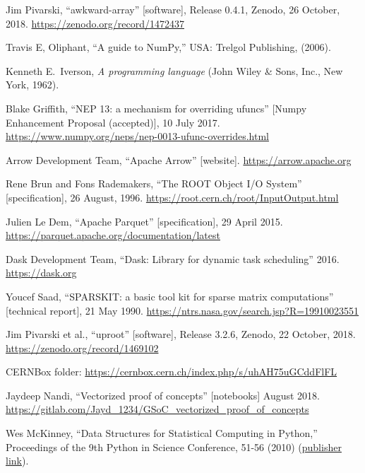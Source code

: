 \documentclass{webofc}
\begin{document}
\vspace{-0.15 cm}
\begin{thebibliography}{8}

 Jim Pivarski, ``awkward-array'' [software], Release 0.4.1, Zenodo, 26 October, 2018. \textcolor{blue}{\url{https://zenodo.org/record/1472437}}

 Travis E, Oliphant, ``A guide to NumPy,'' USA: Trelgol Publishing, (2006).

 Kenneth E.\ Iverson, \textit{A programming language} (John Wiley \& Sons, Inc., New York, 1962).

 Blake Griffith, ``NEP 13: a mechanism for overriding ufuncs'' [Numpy Enhancement Proposal (accepted)], 10 July 2017. \textcolor{blue}{\url{https://www.numpy.org/neps/nep-0013-ufunc-overrides.html}}

 Arrow Development Team, ``Apache Arrow'' [website]. \textcolor{blue}{\url{https://arrow.apache.org}}

 Rene Brun and Fons Rademakers, ``The ROOT Object I/O System'' [specification], 26 August, 1996. \textcolor{blue}{\url{https://root.cern.ch/root/InputOutput.html}}

 Julien Le Dem, ``Apache Parquet'' [specification], 29 April 2015. \textcolor{blue}{\url{https://parquet.apache.org/documentation/latest}}

 Dask Development Team, ``Dask: Library for dynamic task scheduling'' 2016. \textcolor{blue}{\url{https://dask.org}}

 Youcef Saad, ``SPARSKIT: a basic tool kit for sparse matrix computations'' [technical report], 21 May 1990. \textcolor{blue}{\url{https://ntrs.nasa.gov/search.jsp?R=19910023551}}

 Jim Pivarski et al., ``uproot'' [software], Release 3.2.6, Zenodo, 22 October, 2018. \textcolor{blue}{\url{https://zenodo.org/record/1469102}}

 CERNBox folder: \textcolor{blue}{\url{https://cernbox.cern.ch/index.php/s/uhAH75uGCddFlFL}}

 Jaydeep Nandi, ``Vectorized proof of concepts'' [notebooks] August 2018. \\ \textcolor{blue}{\url{https://gitlab.com/Jayd_1234/GSoC_vectorized_proof_of_concepts}}

 Wes McKinney, ``Data Structures for Statistical Computing in Python,'' Proceedings of the 9th Python in Science Conference, 51-56 (2010) (\textcolor{blue}{\href{http://conference.scipy.org/proceedings/scipy2010/mckinney.html}{publisher link}}).


\end{thebibliography}
\end{document}
